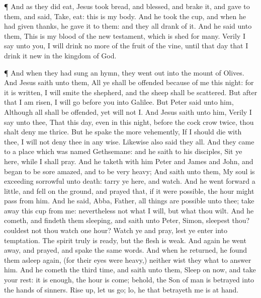  ¶ And as they did eat, Jesus took bread, and blessed, and
brake it, and gave to them, and said, Take, eat: this is my body.
 And he took the cup, and when he had given thanks, he gave
it to them: and they all drank of it.  And he said unto
them, This is my blood of the new testament, which is shed for many.
 Verily I say unto you, I will drink no more of the fruit
of the vine, until that day that I drink it new in the kingdom of God.

 ¶ And when they had sung an hymn, they went out into the
mount of Olives.  And Jesus saith unto them, All ye shall
be offended because of me this night: for it is written, I will smite
the shepherd, and the sheep shall be scattered.  But after
that I am risen, I will go before you into Galilee.  But
Peter said unto him, Although all shall be offended, yet will not I.
 And Jesus saith unto him, Verily I say unto thee, That
this day, even in this night, before the cock crow twice, thou shalt
deny me thrice.  But he spake the more vehemently, If I
should die with thee, I will not deny thee in any wise. Likewise also
said they all.  And they came to a place which was named
Gethsemane: and he saith to his disciples, Sit ye here, while I shall
pray.  And he taketh with him Peter and James and John, and
began to be sore amazed, and to be very heavy;  And saith
unto them, My soul is exceeding sorrowful unto death: tarry ye here, and
watch.  And he went forward a little, and fell on the
ground, and prayed that, if it were possible, the hour might pass from
him.  And he said, Abba, Father, all things are possible
unto thee; take away this cup from me: nevertheless not what I will, but
what thou wilt.  And he cometh, and findeth them sleeping,
and saith unto Peter, Simon, sleepest thou? couldest not thou watch one
hour?  Watch ye and pray, lest ye enter into temptation.
The spirit truly is ready, but the flesh is weak.  And
again he went away, and prayed, and spake the same words. 
And when he returned, he found them asleep again, (for their eyes were
heavy,) neither wist they what to answer him.  And he
cometh the third time, and saith unto them, Sleep on now, and take your
rest: it is enough, the hour is come; behold, the Son of man is betrayed
into the hands of sinners.  Rise up, let us go; lo, he that
betrayeth me is at hand.

